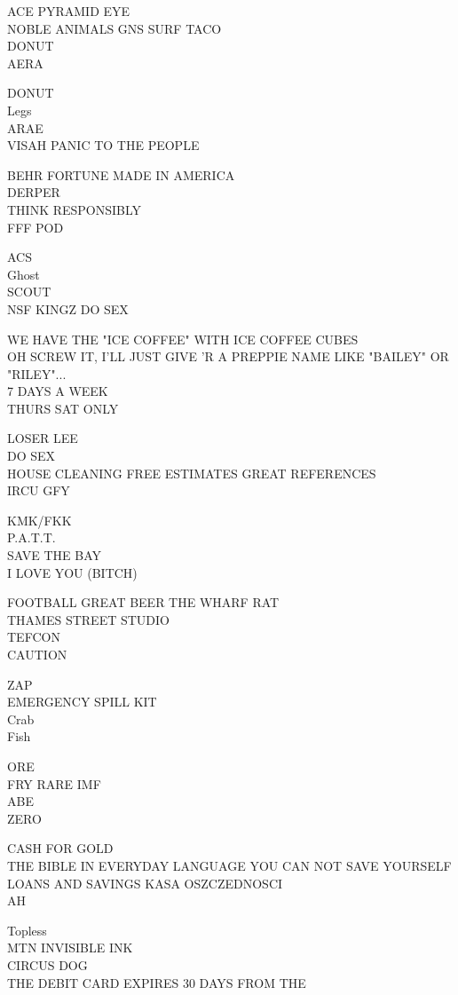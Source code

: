 \documentclass[10pt,letterpaper]{article}
\begin{document}
ACE PYRAMID EYE\\
NOBLE ANIMALS GNS SURF TACO\\
DONUT\\
AERA

DONUT\\
Legs\\
ARAE\\
VISAH PANIC TO THE PEOPLE

BEHR FORTUNE MADE IN AMERICA\\
DERPER\\
THINK RESPONSIBLY\\
FFF POD

ACS\\
Ghost\\
SCOUT\\
NSF KINGZ DO SEX

WE HAVE THE "ICE COFFEE" WITH ICE COFFEE CUBES\\
OH SCREW IT, I'LL JUST GIVE 'R A PREPPIE NAME LIKE "BAILEY" OR "RILEY"...\\
7 DAYS A WEEK\\
THURS SAT ONLY

LOSER LEE\\
DO SEX\\
HOUSE CLEANING FREE ESTIMATES GREAT REFERENCES\\
IRCU GFY

KMK/FKK\\
P.A.T.T.\\
SAVE THE BAY\\
I LOVE YOU (BITCH)

FOOTBALL GREAT BEER THE WHARF RAT\\
THAMES STREET STUDIO\\
TEFCON\\
CAUTION

ZAP\\
EMERGENCY SPILL KIT\\
Crab\\
Fish

ORE\\
FRY RARE IMF\\
ABE\\
ZERO

CASH FOR GOLD\\
THE BIBLE IN EVERYDAY LANGUAGE YOU CAN NOT SAVE YOURSELF\\
LOANS AND SAVINGS KASA OSZCZEDNOSCI\\
AH

Topless\\
MTN INVISIBLE INK\\
CIRCUS DOG\\
THE DEBIT CARD EXPIRES 30 DAYS FROM THE
\end{document}
